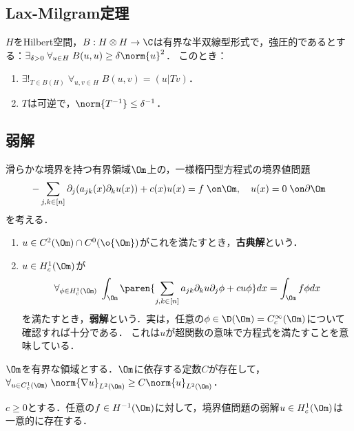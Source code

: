 \documentclass[uplatex, dvipdfmx]{jsreport}
\begin{document}
\subsection{Lax-Milgram定理}

\begin{theorem}
    $H$をHilbert空間，$B:H\otimes H\to\C$は有界な半双線型形式で，強圧的であるとする：$\exists_{\delta>0}\;\forall_{u\in H}\;B(u,u)\ge\delta\norm{u}^2$．
    このとき：
    \begin{enumerate}
        \item $\exists!_{T\in B(H)}\;\forall_{u,v\in H}\;B(u,v)=(u|Tv)$．
        \item $T$は可逆で，$\norm{T^{-1}}\le\delta^{-1}$．
    \end{enumerate}
\end{theorem}

\subsection{弱解}

\begin{problem}
    滑らかな境界を持つ有界領域$\Om$上の，一様楕円型方程式の境界値問題
    \[-\sum_{j,k\in[n]}\partial_j(a_{jk}(x)\partial_ku(x))+c(x)u(x)=f\;\on \Om,\quad u(x)=0\;\on\partial\Om\]
    を考える．
    \begin{enumerate}
        \item $u\in C^2(\Om)\cap C^0(\o{\Om})$がこれを満たすとき，\textbf{古典解}という．
        \item $u\in H^1_c(\Om)$が
        \[\forall_{\phi\in H_c^1(\Om)}\;\int_\Om\paren{\sum_{j,k\in[n]}a_{jk}\partial_ku\partial_j\phi+cu\phi}dx=\int_\Om f\phi dx\]
        を満たすとき，\textbf{弱解}という．実は，任意の$\phi\in\D(\Om)=C_c^\infty(\Om)$について確認すれば十分である．
        これは$u$が超関数の意味で方程式を満たすことを意味している．
    \end{enumerate}
\end{problem}

\begin{lemma}[Poincare]
    $\Om$を有界な領域とする．$\Om$に依存する定数$C$が存在して，$\forall_{u\in C_c^1(\Om)}\;\norm{\nabla u}_{L^2(\Om)}\ge C\norm{u}_{L^2(\Om)}$．
\end{lemma}

\begin{theorem}
    $c\ge0$とする．任意の$f\in H^{-1}(\Om)$に対して，境界値問題の弱解$u\in H^1_c(\Om)$は一意的に存在する．
\end{theorem}
\end{document}

